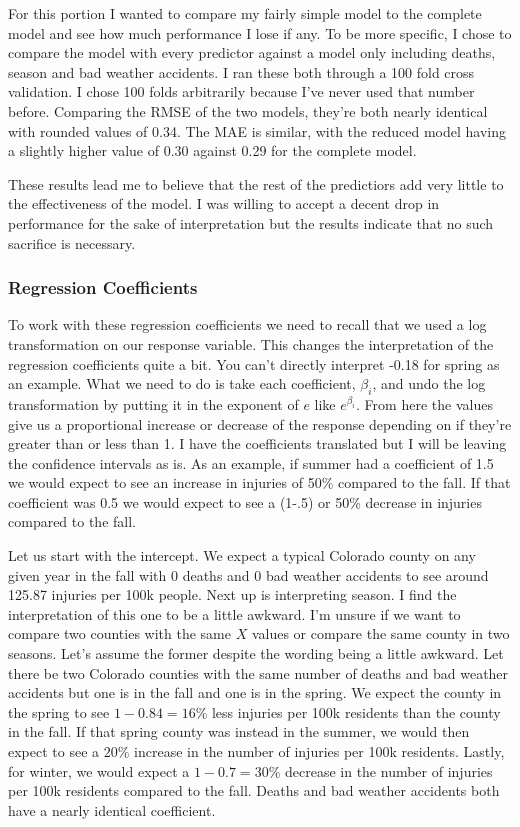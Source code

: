 For this portion I wanted to compare my fairly simple model to the complete model and see how much performance I lose if any. To be more specific, I chose to compare the model with every predictor against a model only including deaths, season and bad weather accidents. I ran these both through a 100 fold cross validation. I chose 100 folds arbitrarily because I've never used that number before. Comparing the RMSE of the two models, they're both nearly identical with rounded values of 0.34. The MAE is similar, with the reduced model having a slightly higher value of 0.30 against 0.29 for the complete model.

These results lead me to believe that the rest of the predictiors add very little to the effectiveness of the model. I was willing to accept a decent drop in performance for the sake of interpretation but the results indicate that no such sacrifice is necessary. 

\subsubsection*{Regression Coefficients}




To work with these regression coefficients we need to recall that we used a log transformation on our response variable. This changes the interpretation of the regression coefficients quite a bit. You can't directly interpret -0.18 for spring as an example. What we need to do is take each coefficient, $\beta_i$, and undo the log transformation by putting it in the exponent of $e$ like $e^{\beta_i}$. From here the values give us a proportional increase or decrease of the response depending on if they're greater than or less than 1. I have the coefficients translated but I will be leaving the confidence intervals as is. As an example, if summer had a coefficient of 1.5 we would expect to see an increase in injuries of 50\% compared to the fall. If that coefficient was 0.5 we would expect to see a (1-.5) or 50\% decrease in injuries compared to the fall.  

Let us start with the intercept. We expect a typical Colorado county on any given year in the fall with 0 deaths and 0 bad weather accidents to see around 125.87 injuries per 100k people. Next up is interpreting season. I find the interpretation of this one to be a little awkward. I'm unsure if we want to compare two counties with the same $X$ values or compare the same county in two seasons. Let's assume the former despite the wording being a little awkward. Let there be two Colorado counties with the same number of deaths and bad weather accidents but one is in the fall and one is in the spring. We expect the county in the spring to see $1-0.84=16\%$ less injuries per 100k residents than the county in the fall. If that spring county was instead in the summer, we would then expect to see a $20\%$ increase in the number of injuries per 100k residents. Lastly, for winter, we would expect a $1-0.7=30\%$ decrease in the number of injuries per 100k residents compared to the fall. Deaths and bad weather accidents both have a nearly identical coefficient. 

